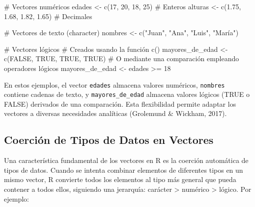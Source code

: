 \documentclass[
  spanish,
  a4paper,
  DIV=11,
  numbers=noendperiod,
  onepage,
  openany]{scrreprt}
\newenvironment{Shaded}{\begin{snugshade}}{\end{snugshade}}
\newcommand{\CommentTok}[1]{\textcolor[rgb]{0.37,0.37,0.37}{#1}}
\newcommand{\ConstantTok}[1]{\textcolor[rgb]{0.56,0.35,0.01}{#1}}
\newcommand{\DecValTok}[1]{\textcolor[rgb]{0.68,0.00,0.00}{#1}}
\newcommand{\FloatTok}[1]{\textcolor[rgb]{0.68,0.00,0.00}{#1}}
\newcommand{\FunctionTok}[1]{\textcolor[rgb]{0.28,0.35,0.67}{#1}}
\newcommand{\NormalTok}[1]{\textcolor[rgb]{0.00,0.23,0.31}{#1}}
\newcommand{\OtherTok}[1]{\textcolor[rgb]{0.00,0.23,0.31}{#1}}
\newcommand{\SpecialCharTok}[1]{\textcolor[rgb]{0.37,0.37,0.37}{#1}}
\newcommand{\StringTok}[1]{\textcolor[rgb]{0.13,0.47,0.30}{#1}}
\begin{document}
\begin{Shaded}
\begin{Highlighting}[]
\CommentTok{\# Vectores numéricos}
\NormalTok{edades }\OtherTok{\textless{}{-}} \FunctionTok{c}\NormalTok{(}\DecValTok{17}\NormalTok{, }\DecValTok{20}\NormalTok{, }\DecValTok{18}\NormalTok{, }\DecValTok{25}\NormalTok{)          }\CommentTok{\# Enteros}
\NormalTok{alturas }\OtherTok{\textless{}{-}} \FunctionTok{c}\NormalTok{(}\FloatTok{1.75}\NormalTok{, }\FloatTok{1.68}\NormalTok{, }\FloatTok{1.82}\NormalTok{, }\FloatTok{1.65}\NormalTok{) }\CommentTok{\# Decimales}

\CommentTok{\# Vectores de texto (character)}
\NormalTok{nombres }\OtherTok{\textless{}{-}} \FunctionTok{c}\NormalTok{(}\StringTok{"Juan"}\NormalTok{, }\StringTok{"Ana"}\NormalTok{, }\StringTok{"Luis"}\NormalTok{, }\StringTok{"María"}\NormalTok{)}

\CommentTok{\# Vectores lógicos}
\CommentTok{\# Creados usando la función c()}
\NormalTok{mayores\_de\_edad }\OtherTok{\textless{}{-}} \FunctionTok{c}\NormalTok{(}\ConstantTok{FALSE}\NormalTok{, }\ConstantTok{TRUE}\NormalTok{, }\ConstantTok{TRUE}\NormalTok{, }\ConstantTok{TRUE}\NormalTok{)}
\CommentTok{\# O mediante una comparación empleando operadores lógicos  }
\NormalTok{mayores\_de\_edad }\OtherTok{\textless{}{-}}\NormalTok{ edades }\SpecialCharTok{\textgreater{}=} \DecValTok{18}
\end{Highlighting}
\end{Shaded}

En estos ejemplos, el vector \texttt{edades} almacena valores numéricos,
\texttt{nombres} contiene cadenas de texto, y \texttt{mayores\_de\_edad}
almacena valores lógicos (TRUE o FALSE) derivados de una comparación.
Esta flexibilidad permite adaptar los vectores a diversas necesidades
analíticas (Grolemund \& Wickham, 2017).

\subsection{Coerción de Tipos de Datos en
Vectores}\label{coerciuxf3n-de-tipos-de-datos-en-vectores}

Una característica fundamental de los vectores en R es la coerción
automática de tipos de datos. Cuando se intenta combinar elementos de
diferentes tipos en un mismo vector, R convierte todos los elementos al
tipo más general que pueda contener a todos ellos, siguiendo una
jerarquía: carácter \textgreater{} numérico \textgreater{} lógico. Por
ejemplo:
\end{document}
